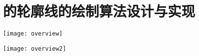 \chapter{\stc{}的轮廓线的绘制算法设计与实现}

\begin{figure*}[!t]
    \centering
    \texttt{[image: overview]}
    \caption{\label{fig:overview}
    系统总览。蓝色/红色的正方形表示左眼/右眼的某种实例。在初始化阶段，首先载入三维模型并对对应于两眼的摄像机进行设置。在后续的每一帧中，轮廓点和极值点先是被绘制并存储到\ppll{}上，然后以这些\ppll{}作为输入进行\epsl{}的判定，最后，基于上一步得到的\epsl{}绘制出\stc{}轮廓线。}
\end{figure*}

\begin{figure*}[!t]
    \centering
    \texttt{[image: overview2]}
    \caption{\label{fig:overview2}
    算法流程说明。为了描述上的简单，该说明只展示了从$L$到$R$计算\stc{}\con{}的过程。首先，\conp{}$a$、$b$、$c$和极值点$d$被计算出来。其次，本文设计的算法在图像空间中对$a$和$b$的\epsl{}进行判定，其中$a$由于遇到了$d$所以判定为不是\stc{}，而$b$由于找到了对应的来自右眼的\conp{}$c$所以判定为\stc{}。最后，将\stc{}的\conp{}$b$和$c$绘制到最终展示的两眼对应图像中。
    }
\end{figure*}

